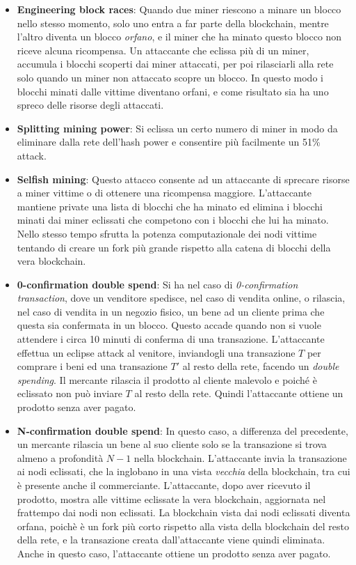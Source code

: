 \begin{itemize}
	\item \textbf{Engineering block races}: Quando due miner riescono a minare un blocco nello stesso momento, solo uno entra a far parte della blockchain, mentre l'altro diventa un blocco \emph{orfano}, e il miner che ha minato questo blocco non riceve alcuna ricompensa. Un attaccante che eclissa più di un miner, accumula i blocchi scoperti dai miner attaccati, per poi rilasciarli alla rete solo quando un miner non attaccato scopre un blocco. In questo modo i blocchi minati dalle vittime diventano orfani, e come risultato sia ha uno spreco delle risorse degli attaccati.
	\item \textbf{Splitting mining power}: Si eclissa un certo numero di miner in modo da eliminare dalla rete dell'hash power e consentire più facilmente un 51\% attack.
	\item \textbf{Selfish mining}: Questo attacco consente ad un attaccante di sprecare risorse a miner vittime o di ottenere una ricompensa maggiore. L'attaccante mantiene private una lista di blocchi che ha minato ed elimina i blocchi minati dai miner eclissati che competono con i blocchi che lui ha minato. Nello stesso tempo sfrutta la potenza computazionale dei nodi vittime tentando di creare un fork più grande rispetto alla catena di blocchi della vera blockchain.
	\item \textbf{0-confirmation double spend}: Si ha nel caso di \emph{0-confirmation transaction}, dove un venditore spedisce, nel caso di vendita online, o rilascia, nel caso di vendita in un negozio fisico, un bene ad un cliente prima che questa sia confermata in un blocco. Questo accade quando non si vuole attendere i circa 10 minuti di conferma di una transazione. L'attaccante effettua un eclipse attack al venitore, inviandogli una transazione $T$ per comprare i beni ed una transazione $T'$ al resto della rete, facendo un \emph{double spending}. Il mercante rilascia il prodotto al cliente malevolo e poiché è eclissato non può inviare $T$ al resto della rete. Quindi l'attaccante ottiene un prodotto senza aver pagato.
	\item \textbf{N-confirmation double spend}: In questo caso, a differenza del precedente, un mercante rilascia un bene al suo cliente solo se la transazione si trova almeno a profondità $N-1$ nella blockchain. L'attaccante invia la transazione ai nodi eclissati, che la inglobano in una vista \emph{vecchia} della blockchain, tra cui è presente anche il commerciante. L'attaccante, dopo aver ricevuto il prodotto, mostra alle vittime eclissate la vera blockchain, aggiornata nel frattempo dai nodi non eclissati. La blockchain vista dai nodi eclissati diventa orfana, poichè è un fork più corto rispetto alla vista della blockchain del resto della rete, e la transazione creata dall'attaccante viene quindi eliminata. Anche in questo caso, l'attaccante ottiene un prodotto senza aver pagato.
\end{itemize}


